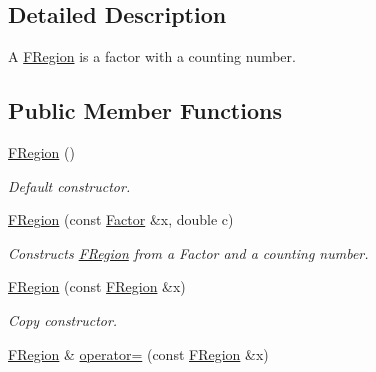\subsection{Detailed Description}
A \hyperlink{classdai_1_1FRegion}{FRegion} is a factor with a counting number. \subsection*{Public Member Functions}
\begin{CompactItemize}
\item 
\hypertarget{classdai_1_1FRegion_b81b699de467dab74cd11d315497c636}{
\hyperlink{classdai_1_1FRegion_b81b699de467dab74cd11d315497c636}{FRegion} ()}
\label{classdai_1_1FRegion_b81b699de467dab74cd11d315497c636}

\begin{CompactList}\small\item\em Default constructor. \item\end{CompactList}\item 
\hypertarget{classdai_1_1FRegion_72b2f014dfb2f98aefa18f2972cf9108}{
\hyperlink{classdai_1_1FRegion_72b2f014dfb2f98aefa18f2972cf9108}{FRegion} (const \hyperlink{classdai_1_1TFactor}{Factor} \&x, double c)}
\label{classdai_1_1FRegion_72b2f014dfb2f98aefa18f2972cf9108}

\begin{CompactList}\small\item\em Constructs \hyperlink{classdai_1_1FRegion}{FRegion} from a Factor and a counting number. \item\end{CompactList}\item 
\hypertarget{classdai_1_1FRegion_ba8e41c104c66c0c6c47a12184b0df17}{
\hyperlink{classdai_1_1FRegion_ba8e41c104c66c0c6c47a12184b0df17}{FRegion} (const \hyperlink{classdai_1_1FRegion}{FRegion} \&x)}
\label{classdai_1_1FRegion_ba8e41c104c66c0c6c47a12184b0df17}

\begin{CompactList}\small\item\em Copy constructor. \item\end{CompactList}\item 
\hypertarget{classdai_1_1FRegion_2a6f340d8cfdef5e5925f5030160920d}{
\hyperlink{classdai_1_1FRegion}{FRegion} \& \hyperlink{classdai_1_1FRegion_2a6f340d8cfdef5e5925f5030160920d}{operator=} (const \hyperlink{classdai_1_1FRegion}{FRegion} \&x)}
\label{classdai_1_1FRegion_2a6f340d8cfdef5e5925f5030160920d}


\end{CompactItemize}
